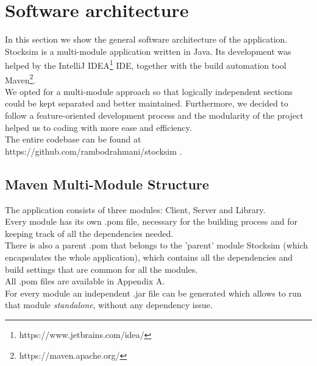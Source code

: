 \chapter{Software architecture}

In this section we show the general software architecture of the application.\\
Stocksim is a multi-module application written in Java. Its development was helped by the IntelliJ IDEA\footnote{https://www.jetbrains.com/idea/} IDE, together with the build automation tool Maven\footnote{https://maven.apache.org/}.\\
We opted for a multi-module approach so that logically independent sections could be kept separated and better maintained. Furthermore, we decided to follow a feature-oriented development process and the modularity of the project helped us to coding with more ease and efficiency.\\
The entire codebase can be found at https://github.com/rambodrahmani/stocksim .

\section{Maven Multi-Module Structure}

The application consists of three modules: Client, Server and Library.\\
Every module has its own .pom file, necessary for the building process and for keeping track of all the dependencies needed.\\
There is also a parent .pom that belongs to the 'parent' module Stocksim (which encapsulates the whole application), which contains all the dependencies and build settings that are common for all the modules.\\
All .pom files are available in Appendix A.\\
For every module an independent .jar file can be generated  which allows to run that module \textit{standalone}, without any dependency issue.


